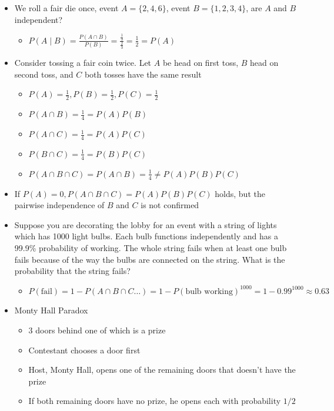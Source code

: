 \documentclass{article}
\begin{document}
\begin{itemize}
\begin{itemize}
    \end{itemize}
    \item We roll a fair die once, event $A = \{2, 4, 6\}$, event $B = \{1, 2, 3, 4\}$, are $A$ and $B$ independent?
    \begin{itemize}
        \item $P(A \mid B) = \frac{P(A \cap B)}{P(B)} = \frac{\frac{1}{3}}{\frac{2}{3}} = \frac{1}{2} = P(A)$
    \end{itemize}
    \item Consider tossing a fair coin twice. Let $A$ be head on first toss, $B$ head on second toss, and $C$ both tosses have the same result
    \begin{itemize}
        \item $P(A)=\frac{1}{2}, P(B)=\frac{1}{2}, P(C)= \frac{1}{2}$
        \item $P(A \cap B) = \frac{1}{4} = P(A)P
        (B)$
        \item $P(A \cap C) = \frac{1}{4} = P(A)P(C)$
        \item $P(B \cap C) = \frac{1}{4} = P(B)P(C)$
        \item $P(A \cap B \cap C) = P(A \cap B) = \frac{1}{4} \neq P(A)P(B)P(C)$
    \end{itemize}
    \item If $P(A) = 0, P(A \cap B \cap C)=P(A)P(B)P(C)$ holds, but the pairwise independence of $B$ and $C$ is not confirmed
    \item Suppose you are decorating the lobby for an event with a string of lights which has 1000 light bulbs. Each bulb functions independently and has a 99.9\% probability of working. The whole string fails when at least one bulb fails because of the way the bulbs are connected on the string. What is the probability that the string fails?
    \begin{itemize}
        \item $P(\text{fail}) = 1 - P(A \cap B \cap C \dots) = 1 - P(\text{bulb working})^{1000} = 1 - 0.99^{1000} \approx 0.63$
    \end{itemize}
    \item Monty Hall Paradox
    \begin{itemize}
        \item 3 doors behind one of which is a prize
        \item Contestant chooses a door first
        \item Host, Monty Hall, opens one of the remaining doors that doesn't have the prize
        \item If both remaining doors have no prize, he opens each with probability $1/2$

\end{itemize}
\end{itemize}
\end{document}
